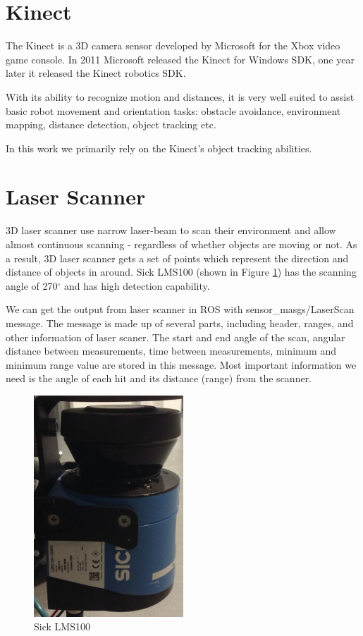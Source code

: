 \section{Kinect}
The Kinect is a 3D camera sensor developed by Microsoft for the Xbox video game console. In 2011 Microsoft released the Kinect for Windows SDK, one year later it released the Kinect robotics SDK.

With its ability to recognize motion and distances, it is very well suited to assist basic robot movement and orientation tasks: obstacle avoidance, environment mapping, distance detection, object tracking etc.

In this work we primarily rely on the Kinect's object tracking abilities.
  
\section{Laser Scanner}
3D laser scanner use narrow laser-beam to scan their environment and allow almost continuous scanning - regardless of whether objects are moving or not. As a result, 3D laser scanner gets a set of points which represent the direction and distance of objects in around. Sick LMS100 (shown in Figure \ref{Laser}) has the scanning angle of  270$^\circ$ and has high detection capability.

We can get the output from laser scanner in ROS with sensor\_masgs/LaserScan message. The message is made up of several parts, including header, ranges, and other information of laser scaner. The start and end angle of the scan, angular distance between measurements, time between measurements, minimum and minimum range value are stored in this message. Most important information we need is the angle of each hit and its distance (range) from the scanner.

\begin{figure}[thpb]
      \centering
      \includegraphics[width=0.5\textwidth]{graphics/Laserscanner.png}
      \caption{Sick LMS100}
      \label{Laser}
   \end{figure}
